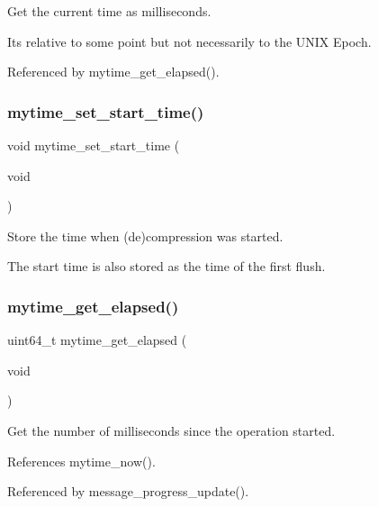 Get the current time as milliseconds. 

It\textquotesingle{}s relative to some point but not necessarily to the U\+N\+IX Epoch. 

Referenced by mytime\+\_\+get\+\_\+elapsed().

\mbox{\label{mytime_8c_abc987b617c3d37bb64f26e2e6a1047f8}} 
\subsubsection{mytime\+\_\+set\+\_\+start\+\_\+time()}
{\footnotesize\ttfamily void mytime\+\_\+set\+\_\+start\+\_\+time (\begin{DoxyParamCaption}\item[{void}]{ }\end{DoxyParamCaption})}



Store the time when (de)compression was started. 

The start time is also stored as the time of the first flush. \mbox{\label{mytime_8c_a1cbb67212ba8955425ec3ae30f854964}} 
\subsubsection{mytime\+\_\+get\+\_\+elapsed()}
{\footnotesize\ttfamily uint64\+\_\+t mytime\+\_\+get\+\_\+elapsed (\begin{DoxyParamCaption}\item[{void}]{ }\end{DoxyParamCaption})}



Get the number of milliseconds since the operation started. 



References mytime\+\_\+now().



Referenced by message\+\_\+progress\+\_\+update().

\mbox{\label{mytime_8c_ade93cf3cf43b05f8cb67474ad7d7589f}} 
